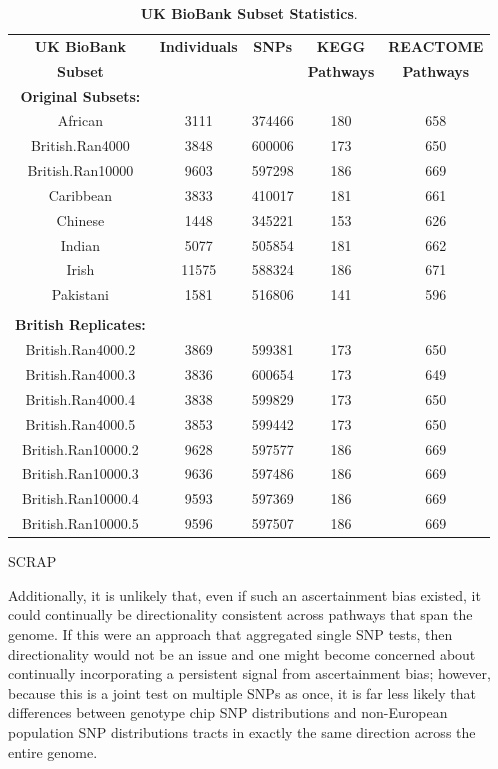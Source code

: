 \documentclass[12pt, a4paper]{article}
\begin{document}
\begin{table}[ht]
\centering
\begin{tabular}{ccccc}
  \hline
\textbf{UK BioBank} & \textbf{Individuals} & \textbf{SNPs} & \textbf{KEGG} & \textbf{REACTOME} \\
\textbf{Subset} & & & \textbf{Pathways} & \textbf{Pathways}  \\
  \hline
\textbf{Original Subsets:} & & & & \\
African & 3111 & 374466 & 180 & 658 \\ 
British.Ran4000 & 3848 & 600006 & 173 & 650 \\ 
British.Ran10000 & 9603 & 597298 & 186 & 669 \\ 
Caribbean & 3833 & 410017 & 181 & 661 \\ 
Chinese & 1448 & 345221 & 153 & 626 \\ 
Indian & 5077 & 505854 & 181 & 662 \\ 
Irish & 11575 & 588324 & 186 & 671 \\ 
Pakistani & 1581 & 516806 & 141 & 596 \\ 
\\
\textbf{British Replicates:} & & & & \\
British.Ran4000.2 & 3869 & 599381 & 173 & 650 \\ 
British.Ran4000.3 & 3836 & 600654 & 173 & 649 \\ 
British.Ran4000.4 & 3838 & 599829 & 173 & 650 \\ 
British.Ran4000.5 & 3853 & 599442 & 173 & 650 \\ 
British.Ran10000.2 & 9628 & 597577 & 186 & 669 \\ 
British.Ran10000.3 & 9636 & 597486 & 186 & 669 \\ 
British.Ran10000.4 & 9593 & 597369 & 186 & 669 \\ 
British.Ran10000.5 & 9596 & 597507 & 186 & 669 \\ 
  \hline
\end{tabular}
\caption[TBD]{\textbf{UK BioBank Subset Statistics}. \\ }
\label{InterPath-Supp-Table-UKBPopStats}
\end{table}
\clearpage



\begingroup


\endgroup


\iffalse

SCRAP

Additionally, it is unlikely that, even if such an ascertainment bias existed, it could continually be directionality consistent across pathways that span the genome. If this were an approach that aggregated single SNP tests, then directionality would not be an issue and one might become concerned about continually incorporating a persistent signal from ascertainment bias; however, because this is a joint test on multiple SNPs as once, it is far less likely that differences between genotype chip SNP distributions and non-European population SNP distributions tracts in exactly the same direction across the entire genome.
\end{document}
